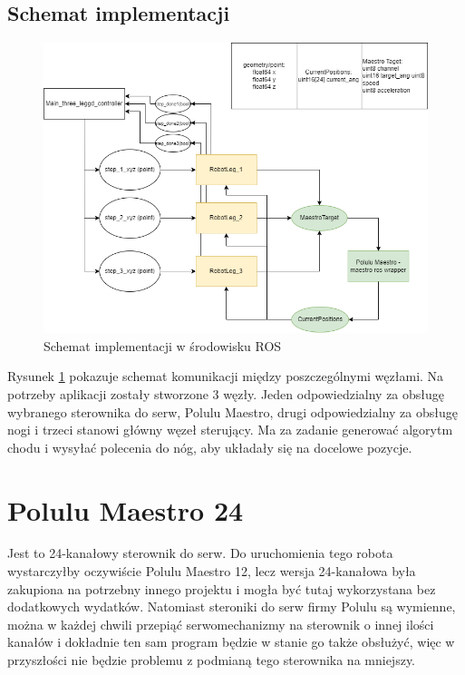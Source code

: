 \subsection{Schemat implementacji}
\begin{figure}[h!]
\includegraphics[width=\textwidth]{img/implementation_schematic.png}
\caption{Schemat implementacji w środowisku ROS}
\label{ros_implementation_schematic}
\end{figure}

Rysunek \ref{ros_implementation_schematic} pokazuje schemat komunikacji między poszczególnymi węzłami. Na potrzeby aplikacji zostały stworzone 3 węzły. Jeden odpowiedzialny za obsługę wybranego sterownika do serw, Polulu Maestro, drugi odpowiedzialny za obsługę nogi i trzeci stanowi główny węzeł sterujący. Ma za zadanie generować algorytm chodu i wysyłać polecenia do nóg, aby układały się na docelowe pozycje.
\section{Polulu Maestro 24}
Jest to 24-kanałowy sterownik do serw. Do uruchomienia tego robota wystarczyłby oczywiście Polulu Maestro 12, lecz wersja 24-kanałowa była zakupiona na potrzebny innego projektu i mogła być tutaj wykorzystana bez dodatkowych wydatków. Natomiast steroniki do serw firmy Polulu są wymienne, można w każdej chwili przepiąć serwomechanizmy na sterownik o innej ilości kanałów i dokładnie ten sam program będzie w stanie go także obsłużyć, więc w przyszłości nie będzie problemu z podmianą tego sterownika na mniejszy.\\

